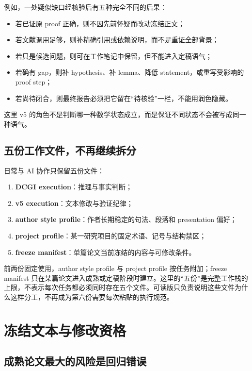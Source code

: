 \documentclass[UTF8,fontset=none,12pt,openany]{ctexbook}
\begin{document}
例如，一处疑似缺口经核验后有五种完全不同的后果：

\begin{itemize}
\item 若已证原 proof 正确，则不因先前怀疑而改动冻结正文；
\item 若文献调用足够，则补精确引用或依赖说明，而不是重证全部背景；
\item 若只是候选问题，则可在工作笔记中保留，但不能进入定稿语气；
\item 若确有 gap，则补 hypothesis、补 lemma、降低 statement，或重写受影响的 proof step；
\item 若尚待闭合，则最终报告必须把它留在“待核验”一栏，不能用润色隐藏。
\end{itemize}

这里 v5 的角色不是判断哪一种数学状态成立，而是保证不同状态不会被写成同一种语气。

\section{五份工作文件，不再继续拆分}

日常与 AI 协作只保留五份文件：

\begin{enumerate}
\item \textbf{DCGI execution}：推理与事实判断；
\item \textbf{v5 execution}：文本修改与验证纪律；
\item \textbf{author style profile}：作者长期稳定的句法、段落和 presentation 偏好；
\item \textbf{project profile}：某一研究项目的固定术语、记号与结构禁区；
\item \textbf{freeze manifest}：单篇论文当前冻结的内容与可修改条件。
\end{enumerate}

前两份固定使用，author style profile 与 project profile 按任务附加；freeze manifest 只在某篇论文进入成熟或定稿阶段时建立。这里的“五份”是完整工作栈的上限，不表示每次任务都必须同时存在五个文件。可读版只负责说明这些文件为什么这样分工，不再成为第六份需要每次粘贴的执行规范。

\chapter{冻结文本与修改资格}

\section{成熟论文最大的风险是回归错误}
\end{document}
